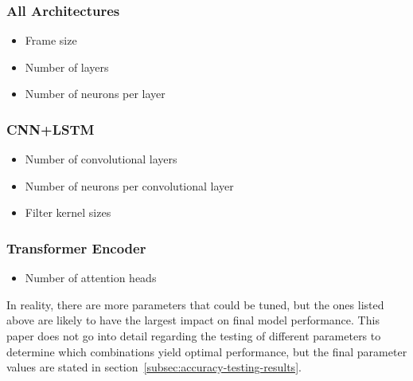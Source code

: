 \subsubsection{All Architectures}
\begin{itemize}
    \item Frame size
    \item Number of layers
    \item Number of neurons per layer
\end{itemize}

\subsubsection{CNN+LSTM}
\begin{itemize}
    \item Number of convolutional layers
    \item Number of neurons per convolutional layer
    \item Filter kernel sizes
\end{itemize}

\subsubsection{Transformer Encoder}
\begin{itemize}
    \item Number of attention heads
\end{itemize}

In reality, there are more parameters that could be tuned, but the ones listed above are likely to have the largest impact on final model performance.
This paper does not go into detail regarding the testing of different parameters to determine which combinations yield optimal performance, but the final parameter values are stated in section~\ref{subsec:accuracy-testing-results}.
